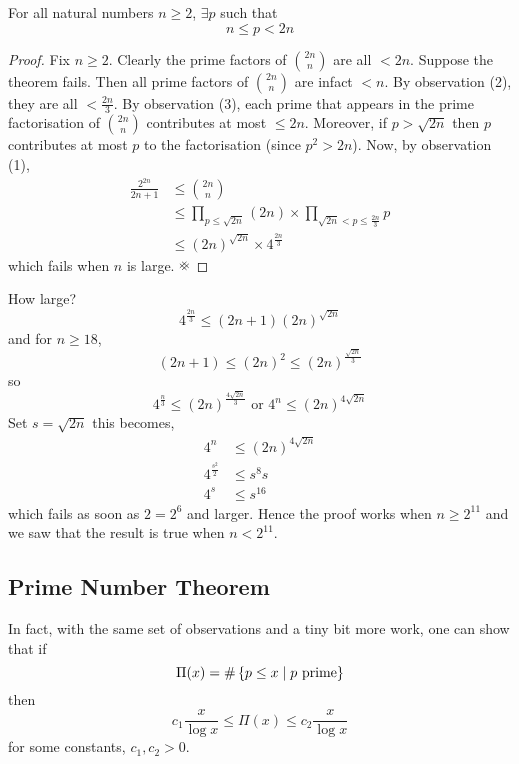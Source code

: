 \documentclass{article}
\begin{document}
\begin{thm}
    For all natural numbers $n \geq 2$, $\exists p$ such that
    \[
        n \leq p < 2n  
    \]
\end{thm}
\begin{proof}
    Fix $n \geq 2$. Clearly the prime factors of $\binom{2n}{n}$ are all $< 2n$.
    Suppose the theorem fails. 
    Then all prime factors of $\binom{2n}{n}$ are infact $<n$.
    By observation (2), they are all $< \frac{2n}{3}$.
    By observation (3), each prime that appears in the prime factorisation of $\binom{2n}{n}$ contributes at most $\leq 2n$.
    Moreover, if $p > \sqrt{2n}$ then $p$ contributes at most $p$ to the factorisation (since $p^2 > 2n$).
    Now, by observation (1),
    \begin{align*}
        \frac{2^{2n}}{2n + 1} &\leq \binom{2n}{n} \\
        &\leq \prod_{p \leq \sqrt{2n}} (2n) \times \prod_{\sqrt{2n} < p \leq \frac{2n}{3}} p \\
        &\leq (2n)^{\sqrt{2n}} \times 4^{\frac{2n}{3}} \tag{observation (4)}
    \end{align*}
    which fails when $n$ is large. $\contradiction$
\end{proof}
\begin{remark}
    How large?
    \[
        4^{\frac{2n}{3}} \leq (2n + 1)(2n)^{\sqrt{2n}}  
    \]
    and for $n \geq 18$,
    \[
        (2n + 1) \leq (2n)^2 \leq (2n)^{\frac{\sqrt{2n}}{3}}
    \]
    so
    \[
        4^{\frac{n}{3}} \leq (2n)^{\frac{4 \sqrt{2n}}{3}} \text{ or } 4^n \leq (2n)^{4 \sqrt{2n}}  
    \]
    Set $s = \sqrt{2n}$ this becomes,
    \begin{align*}
        4^n &\leq (2n)^{4 \sqrt{2n}} \\
        4^{\frac{s^2}{2}} &\leq s^8s \\
        4^s & \leq s^16
    \end{align*}
    which fails as soon as $2 = 2^6$ and larger.
    Hence the proof works when $n \geq 2^{11}$ and we saw that the result is true when $n < 2^{11}$.
\end{remark}

\subsection{Prime Number Theorem}
In fact, with the same set of observations and a tiny bit more work, one can show that if
\[
    \Pi(x) = \# \left\{ p \leq x \mid p \text{ prime} \right\}
\]
then
\[
    c_1 \frac{x}{\log x} \leq \Pi(x) \leq c_2 \frac{x}{\log x}
\]
for some constants, $c_1, c_2 > 0$.
\end{document}
